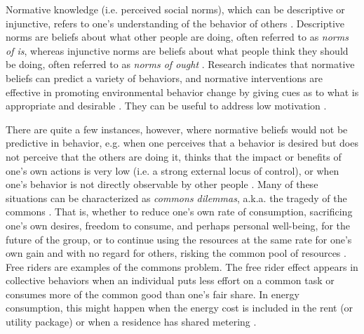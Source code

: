 \documentclass[a4paper,10pt]{article}
\begin{document}
Normative knowledge (i.e. perceived social norms), which can be descriptive or injunctive, refers to one's understanding of the behavior of others \citep{Schultz2002}. Descriptive norms are beliefs about what other people are doing, often referred to as \textit{norms of is}, whereas injunctive norms are beliefs about what people think they should be doing, often referred to as \textit{norms of ought} \citep{Schultz2002}. Research indicates that normative beliefs can predict a variety of behaviors, and normative interventions are effective in promoting environmental behavior change by giving cues as to what is appropriate and desirable \citep{Cialdini2004,Allcott2011,Schultz2002, Petkov2011,Delmas2013}. They can be useful to address low motivation \citep{schultz2015strategies}. 

There are quite a few instances, however, where normative beliefs would not be predictive in behavior, e.g. when one perceives that a behavior is desired but does not perceive that the others are doing it, thinks that the impact or benefits of one's own actions is very low (i.e. a strong external locus of control), or when one's behavior is not directly observable by other people \citep{Schultz2002,ockwell2009reorienting}. Many of these situations can be characterized as \textit{commons dilemmas}, a.k.a. the tragedy of the commons \citep{Hardin1968,Schultz2002}. That is, whether to reduce one's own rate of consumption, sacrificing one's own desires, freedom to consume, and perhaps personal well-being, for the future of the group, or to continue using the resources at the same rate for one's own gain and with no regard for others, risking the common pool of resources \citep{Edney1978,Edney1980}. Free riders are examples of the commons problem. The free rider effect appears in collective behaviors \citep{isaac1984divergent,andreoni1988free,feldman2005overcoming} when an individual puts less effort on a common task or consumes more of the common good than one's fair share. In energy consumption, this might happen when the energy cost is included in the rent (or utility package) \citep{munley1990electricity} or when a residence has shared metering \citep{dewees2011impact}.
\end{document}
